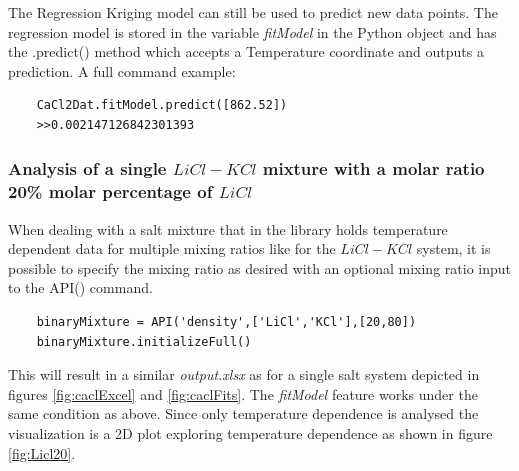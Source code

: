 The Regression Kriging model can still be used to predict new data points. The regression model is stored in the variable \textit{fitModel} in the Python object and has the .predict() method which accepts a Temperature coordinate and outputs a prediction. A full command example:
\begin{verbatim}
    CaCl2Dat.fitModel.predict([862.52])
    >>0.002147126842301393
\end{verbatim}

\subsubsection{Analysis of a single $LiCl-KCl$ mixture with a molar ratio 20\% molar percentage of $LiCl$}
When dealing with a salt mixture that in the library holds temperature dependent data for multiple mixing ratios like for the $LiCl-KCl$ system, it is possible to specify the mixing ratio as desired with an optional mixing ratio input to the API() command.

\begin{verbatim}
    binaryMixture = API('density',['LiCl','KCl'],[20,80])
    binaryMixture.initializeFull()
\end{verbatim}
This will result in a similar \textit{output.xlsx} as for a single salt system depicted in figures \ref{fig:caclExcel} and \ref{fig:caclFits}. The \textit{fitModel} feature works under the same condition as above. Since only temperature dependence is analysed the visualization is a 2D plot exploring temperature dependence as shown in figure \ref{fig:Licl20}.


